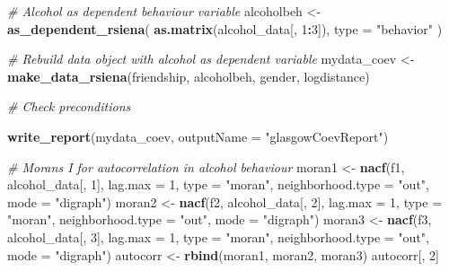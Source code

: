 \documentclass[
]{article}
\newenvironment{Shaded}{\begin{snugshade}}{\end{snugshade}}
\newcommand{\AttributeTok}[1]{\textcolor[rgb]{0.13,0.29,0.53}{#1}}
\newcommand{\CommentTok}[1]{\textcolor[rgb]{0.56,0.35,0.01}{\textit{#1}}}
\newcommand{\DecValTok}[1]{\textcolor[rgb]{0.00,0.00,0.81}{#1}}
\newcommand{\FunctionTok}[1]{\textcolor[rgb]{0.13,0.29,0.53}{\textbf{#1}}}
\newcommand{\NormalTok}[1]{#1}
\newcommand{\OtherTok}[1]{\textcolor[rgb]{0.56,0.35,0.01}{#1}}
\newcommand{\SpecialCharTok}[1]{\textcolor[rgb]{0.81,0.36,0.00}{\textbf{#1}}}
\newcommand{\StringTok}[1]{\textcolor[rgb]{0.31,0.60,0.02}{#1}}
\begin{document}
\begin{Shaded}
\begin{Highlighting}[]
\CommentTok{\# Alcohol as dependent behaviour variable}
\NormalTok{alcoholbeh }\OtherTok{\textless{}{-}} \FunctionTok{as\_dependent\_rsiena}\NormalTok{(}
  \FunctionTok{as.matrix}\NormalTok{(alcohol\_data[, }\DecValTok{1}\SpecialCharTok{:}\DecValTok{3}\NormalTok{]), }
  \AttributeTok{type =} \StringTok{"behavior"}
\NormalTok{)}

\CommentTok{\# Rebuild data object with alcohol as dependent variable}
\NormalTok{mydata\_coev }\OtherTok{\textless{}{-}} \FunctionTok{make\_data\_rsiena}\NormalTok{(friendship, alcoholbeh, gender, logdistance)}

\CommentTok{\# Check preconditions}
\end{Highlighting}
\end{Shaded}

\begin{Shaded}
\begin{Highlighting}[]
\FunctionTok{write\_report}\NormalTok{(mydata\_coev, }\AttributeTok{outputName =} \StringTok{"glasgowCoevReport"}\NormalTok{)}
\end{Highlighting}
\end{Shaded}

\begin{Shaded}
\begin{Highlighting}[]
\CommentTok{\# Moran\textquotesingle{}s I for autocorrelation in alcohol behaviour}
\NormalTok{moran1 }\OtherTok{\textless{}{-}} \FunctionTok{nacf}\NormalTok{(f1, alcohol\_data[, }\DecValTok{1}\NormalTok{], }\AttributeTok{lag.max =} \DecValTok{1}\NormalTok{, }\AttributeTok{type =} \StringTok{"moran"}\NormalTok{,}
               \AttributeTok{neighborhood.type =} \StringTok{"out"}\NormalTok{, }\AttributeTok{mode =} \StringTok{"digraph"}\NormalTok{)}
\NormalTok{moran2 }\OtherTok{\textless{}{-}} \FunctionTok{nacf}\NormalTok{(f2, alcohol\_data[, }\DecValTok{2}\NormalTok{], }\AttributeTok{lag.max =} \DecValTok{1}\NormalTok{, }\AttributeTok{type =} \StringTok{"moran"}\NormalTok{,}
               \AttributeTok{neighborhood.type =} \StringTok{"out"}\NormalTok{, }\AttributeTok{mode =} \StringTok{"digraph"}\NormalTok{)}
\NormalTok{moran3 }\OtherTok{\textless{}{-}} \FunctionTok{nacf}\NormalTok{(f3, alcohol\_data[, }\DecValTok{3}\NormalTok{], }\AttributeTok{lag.max =} \DecValTok{1}\NormalTok{, }\AttributeTok{type =} \StringTok{"moran"}\NormalTok{,}
               \AttributeTok{neighborhood.type =} \StringTok{"out"}\NormalTok{, }\AttributeTok{mode =} \StringTok{"digraph"}\NormalTok{)}
\NormalTok{autocorr }\OtherTok{\textless{}{-}} \FunctionTok{rbind}\NormalTok{(moran1, moran2, moran3)}
\NormalTok{autocorr[, }\DecValTok{2}\NormalTok{]}
\end{Highlighting}
\end{Shaded}
\end{document}
